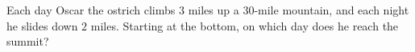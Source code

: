 Each day Oscar the ostrich climbs $3$ miles up a $30$-mile mountain, and each night he slides down $2$ miles. Starting at the bottom, on which day does he reach the summit?
